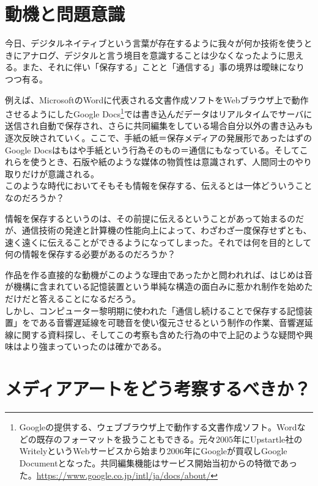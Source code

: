 \documentclass[a4paper,report]{jsbook}
\begin{document}
\section{動機と問題意識}\label{ux52d5ux6a5fux3068ux554fux984cux610fux8b58}

今日、デジタルネイティブという言葉が存在するように我々が何か技術を使うときにアナログ、デジタルと言う境目を意識することは少なくなったように思える。また、それに伴い「保存する」ことと「通信する」事の境界は曖昧になりつつ有る。

例えば、MicrosoftのWordに代表される文書作成ソフトをWebブラウザ上で動作させるようにしたGoogle
Docs\footnote{Googleの提供する、ウェブブラウザ上で動作する文書作成ソフト。Wordなどの既存のフォーマットを扱うこともできる。元々2005年にUpstartle社のWritelyというWebサービスから始まり2006年にGoogleが買収しGoogle
  Documentとなった。共同編集機能はサービス開始当初からの特徴であった。\url{https://www.google.co.jp/intl/ja/docs/about/}}では書き込んだデータはリアルタイムでサーバに送信され自動で保存され、さらに共同編集をしている場合自分以外の書き込みも逐次反映されていく。ここで、手紙の紙＝保存メディアの発展形であったはずのGoogle
Docsはもはや手紙という行為そのもの＝通信にもなっている。そしてこれらを使うとき、石版や紙のような媒体の物質性は意識されず、人間同士のやり取りだけが意識される。\\
このような時代においてそもそも情報を保存する、伝えるとは一体どういうことなのだろうか？

情報を保存するというのは、その前提に伝えるということがあって始まるのだが、通信技術の発達と計算機の性能向上によって、わざわざ一度保存せずとも、速く遠くに伝えることができるようになってしまった。それでは何を目的として何の情報を保存する必要があるのだろうか？

作品を作る直接的な動機がこのような理由であったかと問われれば、はじめは音が機構に含まれている記憶装置という単純な構造の面白みに惹かれ制作を始めただけだと答えることになるだろう。\\
しかし、コンピューター黎明期に使われた「通信し続けることで保存する記憶装置」をである音響遅延線を可聴音を使い復元させるという制作の作業、音響遅延線に関する資料探し、そしてこの考察も含めた行為の中で上記のような疑問や興味はより強まっていったのは確かである。

\section{メディアアートをどう考察するべきか？}\label{ux30e1ux30c7ux30a3ux30a2ux30a2ux30fcux30c8ux3092ux3069ux3046ux8003ux5bdfux3059ux308bux3079ux304dux304b}
\end{document}

